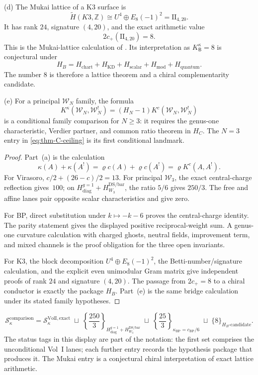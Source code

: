 \begin{theorem}
\textup{(d)} The Mukai lattice of a K3 surface is
\[
 \widetilde H(K3,\mathbb Z)
 \cong U^4\oplus E_8(-1)^2
 =\mathrm{II}_{4,20}.
\]
It has rank \(24\), signature \((4,20)\), and the exact arithmetic
value
\[
 2c_+(\mathrm{II}_{4,20})=8.
\]
This is the Mukai-lattice calculation of \cite{Mukai1987}.
Its interpretation as
\(K^\kappa_{\mathsf B}=8\) is conjectural under
\[
 H_B=
 H_{\mathrm{chart}}+H_{\mathrm{KD}}+H_{\mathrm{scalar}}
 +H_{\mathrm{mod}}+H_{\mathrm{quantum}}.
\]
The number \(8\) is therefore a lattice theorem and a chiral
complementarity candidate.

\textup{(e)} For a principal \(\mathcal W_N\) family, the formula
\begin{equation}\label{eq:thm-C-WN}
 K^\kappa(\mathcal W_N,\mathcal W_N^!)
 =(H_N-1)K^c(\mathcal W_N,\mathcal W_N^!)
\end{equation}
is a conditional family comparison for \(N\ge3\): it requires the
genus-one characteristic, Verdier partner, and common ratio theorem
in \(H_C\).  The \(N=3\) entry in
\eqref{eq:thm-C-ceiling} is its first conditional landmark.
\end{theorem}

\begin{proof}
Part~\textup{(a)} is the calculation
\[
 \kappa(A)+\kappa(A^!)
 =\varrho c(A)+\varrho c(A^!)
 =\varrho K^c(A,A^!).
\]
For Virasoro,
\(c/2+(26-c)/2=13\).  For principal \(\mathcal W_3\),
the exact central-charge reflection gives~\(100\); on
$H_{\mathrm{diag}}^{g=1}+H_{W_3}^{\mathrm{DS/bar}}$, the ratio
\(5/6\) gives \(250/3\).  The free and affine lanes pair opposite scalar
characteristics and give zero.

For BP, direct substitution under \(k\mapsto-k-6\) proves the
central-charge identity.  The parity statement gives the displayed
positive reciprocal-weight sum.  A genus-one curvature calculation
with charged ghosts, neutral fields, improvement term, and mixed
channels is the proof obligation for the three open invariants.

For K3, the block decomposition
\(U^4\oplus E_8(-1)^2\), the Betti-number/signature calculation, and
the explicit even unimodular Gram matrix give independent proofs of
rank \(24\) and signature \((4,20)\).  The passage from
\(2c_+=8\) to a chiral conductor is exactly the package \(H_B\).
Part~\textup{(e)} is the same bridge calculation under its stated
family hypotheses.
\end{proof}

\begin{equation}\label{eq:thm-C-full-set}
 \mathcal S^\mathrm{comparison}_\kappa
 =
 \mathcal S^{\mathrm{VolI,exact}}_\kappa
 \;\sqcup\;
 \left\{\frac{250}{3}\right\}_{H_{\mathrm{diag}}^{g=1}+H_{W_3}^{\mathrm{DS/bar}}}
 \;\sqcup\;
 \left\{\frac{25}{3}\right\}_{\kappa_{\mathrm{BP}}=c_{\mathrm{BP}}/6}
 \;\sqcup\;
 \{8\}_{H_B\text{-candidate}}.
\end{equation}
The status tags in this display are part of the notation: the first set
comprises the unconditional Vol~I lanes; each further entry records the
hypothesis package that produces it.  The Mukai entry is a conjectural
chiral interpretation of exact lattice arithmetic.

